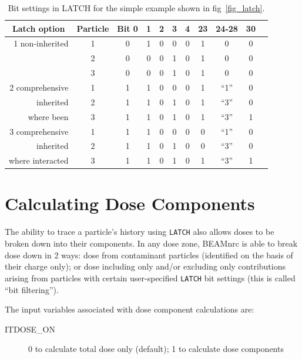 \documentclass[12pt,twoside]{article}
\begin{document}
\begin{table}[H]
\vspace*{-1cm}
\begin{center}
\caption{Bit settings in LATCH for the simple example shown in
fig~\ref{fig_latch}.}
\label{table_latch}
\begin{tabular}{|r|c|ccccccc|c|c|}
\hline
\multicolumn{1}{|c}{Latch option} &
\multicolumn{1}{|c}{Particle} &
\multicolumn{1}{|c}{Bit 0} &
\multicolumn{1}{c}{1} &
\multicolumn{1}{c}{2} &
\multicolumn{1}{c}{3} &
\multicolumn{1}{c}{4} &
\multicolumn{1}{c}{23} &
\multicolumn{1}{c}{24-28} &
\multicolumn{1}{c|}{30}\\
\hline
1 non-inherited & 1 & 0 & 1 & 0 & 0 & 0 & 1 & 0 & 0\\
~~~             & 2 & 0 & 0 & 0 & 1 & 0 & 1 & 0 & 0\\
~~~~~~~         & 3 & 0 & 0 & 0 & 1 & 0 & 1 & 0 & 0\\
\hline
2 comprehensive & 1 & 1 & 1 & 0 & 0 & 0 & 1 & ``1'' & 0\\
inherited       & 2 & 1 & 1 & 0 & 1 & 0 & 1 & ``3'' & 0\\
where been      & 3 & 1 & 1 & 0 & 1 & 0 & 1 & ``3'' & 1\\
\hline
3 comprehensive & 1 & 1 & 1 & 0 & 0 & 0 & 0 & ``1'' & 0\\
inherited       & 2 & 1 & 1 & 0 & 1 & 0 & 0 & ``3'' & 0\\
where interacted & 3 & 1 & 1 & 0 & 1 & 0 & 1 & ``3'' & 1\\
\hline
\end{tabular}
\end{center}
\end{table}

\clearpage

\section{Calculating Dose Components}
\label{dosecompsect}

The ability to trace a particle's history using \verb+LATCH+ also allows doses
to be broken down into their components.  In any dose zone, BEAMnrc is able
to break dose down in 2 ways:
dose from contaminant particles (identified on
the basis of their charge only); or dose including only and/or excluding
only contributions arising from particles with certain user-specified
\verb+LATCH+ bit settings (this is called ``bit filtering'').

The input variables associated with dose component calculations are:
\begin{description}
\item [ITDOSE\_ON] 0 to calculate total dose only (default);
1 to calculate dose components
\end{description}
\end{document}
